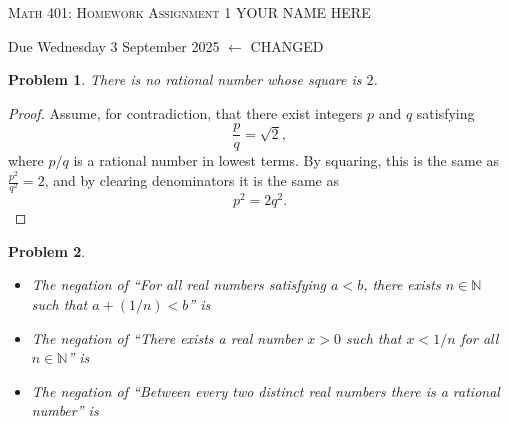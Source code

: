 \documentclass[12pt]{article}
\newtheorem{problem}{Problem}
\newcommand{\NN}{\ensuremath{\mathbb N}}
\begin{document}
\small
\noindent \textsc{Math 401: Homework Assignment 1} \hfill YOUR NAME HERE

\noindent \hfill Due Wednesday 3 September 2025 \hfill $\leftarrow$ CHANGED
\normalsize
\bigskip

\setcounter{problem}{0} %


\begin{problem} %
There is no rational number whose square is $2$. \end{problem}


\begin{proof}
Assume, for contradiction, that there exist integers $p$ and $q$ satisfying
	$$\frac{p}{q} = \sqrt{2},$$
where $p/q$ is a rational number in lowest terms.  By squaring, this is the same as $\frac{p^2}{q^2} = 2$, and by clearing denominators it is the same as
	$$p^2 = 2 q^2.$$
\end{proof}


\begin{problem} %


\begin{itemize}
\item[(a)] The negation of ``For all real numbers satisfying $a<b$, there exists $n\in\NN$ such that $a+(1/n)<b$'' is

\item[(b)] The negation of ``There exists a real number $x>0$ such that $x<1/n$ for all $n\in\NN$'' is

\item[(c)] The negation of ``Between every two distinct real numbers there is a rational number'' is

\end{itemize}
\end{problem}
\end{document}
